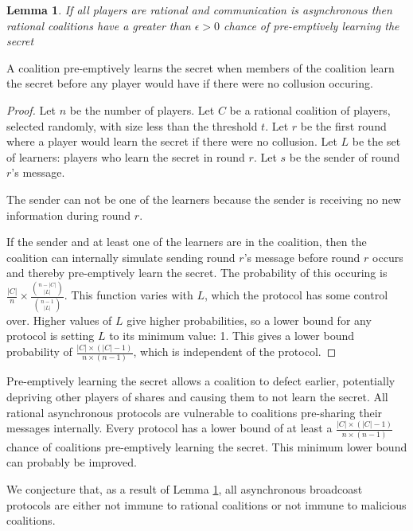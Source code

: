 \documentclass{dalcsthesis}
\newtheorem{lemma}{Lemma}
\begin{document}
\begin{lemma} If all players are rational and communication is asynchronous then rational coalitions have a greater than $\epsilon > 0$ chance of pre-emptively learning the secret \label{Lem:Async:CoalitionsMayPreempt} \end{lemma}

A coalition pre-emptively learns the secret when members of the coalition learn the secret before any player would have if there were no collusion occuring.

\begin{proof}
Let $n$ be the number of players.
Let $C$ be a rational coalition of players, selected randomly, with size less than the threshold $t$.
Let $r$ be the first round where a player would learn the secret if there were no collusion.
Let $L$ be the set of learners: players who learn the secret in round $r$.
Let $s$ be the sender of round $r$'s message.

The sender can not be one of the learners because the sender is receiving no new information during round $r$.

If the sender and at least one of the learners are in the coalition, then the coalition can internally simulate sending round $r$'s message before round $r$ occurs and thereby pre-emptively learn the secret. The probability of this occuring is $\frac{|C|}{n} \times \frac{{n - |C| \choose |L|}}{{n - 1 \choose |L|}}$. This function varies with $L$, which the protocol has some control over. Higher values of $L$ give higher probabilities, so a lower bound for any protocol is setting $L$ to its minimum value: 1. This gives a lower bound probability of $\frac{|C| \times (|C| - 1)}{n \times (n-1)}$, which is independent of the protocol.
\end{proof}

Pre-emptively learning the secret allows a coalition to defect earlier, potentially depriving other players of shares and causing them to not learn the secret. All rational asynchronous protocols are vulnerable to coalitions pre-sharing their messages internally. Every protocol has a lower bound of at least a $\frac{|C| \times (|C| - 1)}{n \times (n-1)}$ chance of coalitions pre-emptively learning the secret. This minimum lower bound can probably be improved.

We conjecture that, as a result of Lemma \ref{Lem:Async:CoalitionsMayPreempt}, all asynchronous broadcoast protocols are either not immune to rational coalitions or not immune to malicious coalitions.
\end{document}

